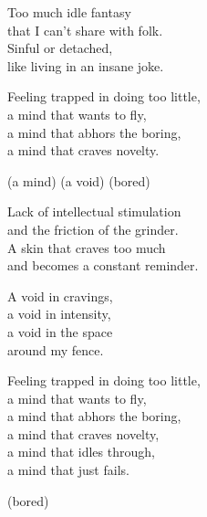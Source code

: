 \begin{lyrics}
Too much idle fantasy\\
that I can't share with folk.\\
Sinful or detached,\\
like living in an insane joke.

Feeling trapped in doing too little,\\
a mind that wants to fly,\\
a mind that abhors the boring,\\
a mind that craves novelty.

(a mind)
(a void)
(bored)

Lack of intellectual stimulation\\
and the friction of the grinder.\\
A skin that craves too much\\
and becomes a constant reminder.

A void in cravings,\\
a void in intensity,\\
a void in the space\\
around my fence.

Feeling trapped in doing too little,\\
a mind that wants to fly,\\
a mind that abhors the boring,\\
a mind that craves novelty,\\
a mind that idles through,\\
a mind that just fails.

(bored)
\end{lyrics}

